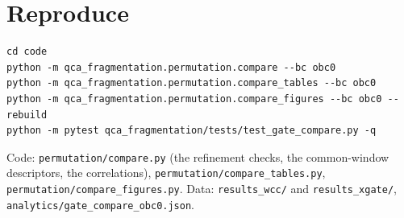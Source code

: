 \documentclass[11pt]{article}
\newcommand{\fn}[1]{\texttt{#1}}
\theoremstyle{plain}
\theoremstyle{remark}
\begin{document}
\section{Reproduce}

\begin{verbatim}
cd code
python -m qca_fragmentation.permutation.compare --bc obc0
python -m qca_fragmentation.permutation.compare_tables --bc obc0
python -m qca_fragmentation.permutation.compare_figures --bc obc0 --rebuild
python -m pytest qca_fragmentation/tests/test_gate_compare.py -q
\end{verbatim}

\begin{sloppypar}
Code: \fn{permutation/compare.py} (the refinement checks, the common-window
descriptors, the correlations), \fn{permutation/compare\_tables.py},
\fn{permutation/compare\_figures.py}. Data: \fn{results\_wcc/} and
\fn{results\_xgate/}, \fn{analytics/gate\_compare\_obc0.json}.
\end{sloppypar}
\end{document}
